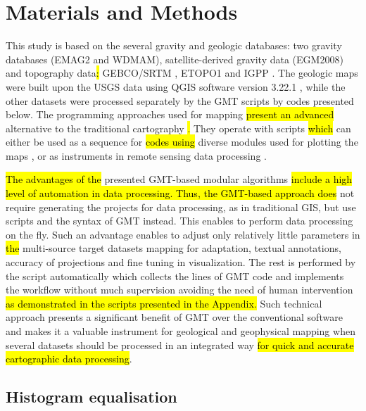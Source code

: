 \documentclass[minerals,article,submit,pdftex,moreauthors]{Definitions/mdpi}
\begin{document}
\section{Materials and Methods}
This study is based on the several gravity and geologic databases: two gravity databases (EMAG2 and WDMAM), satellite-derived gravity data (EGM2008) and topography data\hl{: }GEBCO/SRTM \cite{GEBCO,SRTM}, ETOPO1 \cite{NOAA} and IGPP \cite{SANDWELL20211059,Pavlis}. The geologic maps were built upon the USGS data using QGIS software version 3.22.1 \cite{QGIS_software}, while the other datasets were processed separately by the GMT scripts by codes presented below. The programming approaches\hl{ }used for mapping \hl{present an advanced }alternative\hl{ }to the traditional cartography\hl{ }\cite{TRAORE2020103933,RUNGE2005311,TRAORE2021100114}\hl{. }They operate with scripts \hl{which }can either be used as a sequence for \hl{codes using }diverse modules used for plotting\hl{ }the maps \cite{4814952,Lemenkova202230,8588718,Lemenkova202228}, or as instruments in remote sensing data processing \cite{9964623,Lemenkova202229,7577632,Lemenkova202227}.

\hl{The advantages of the }presented GMT-based modular algorithms \hl{include a high level of automation in data processing. Thus, the GMT-based approach does }not require generating the projects for data processing, as in traditional GIS, but use scripts and the syntax of GMT instead. This enables to perform data processing on the fly. Such an advantage enables to adjust only relatively little parameters in \hl{the }multi-source target datasets mapping for adaptation, textual annotations, accuracy of projections and fine tuning in visualization. The rest is performed by the script automatically which collects the lines of GMT code and implements the workflow without much supervision\hl{ }avoiding the need of human intervention\hl{ as demonstrated in the scripts presented in the Appendix. }Such technical approach presents a significant benefit of GMT over the conventional software and makes it a valuable instrument for geological and geophysical mapping when several datasets should be processed in an integrated way \hl{for quick and accurate cartographic data processing}.

\subsection{Histogram equalisation}
\end{document}
